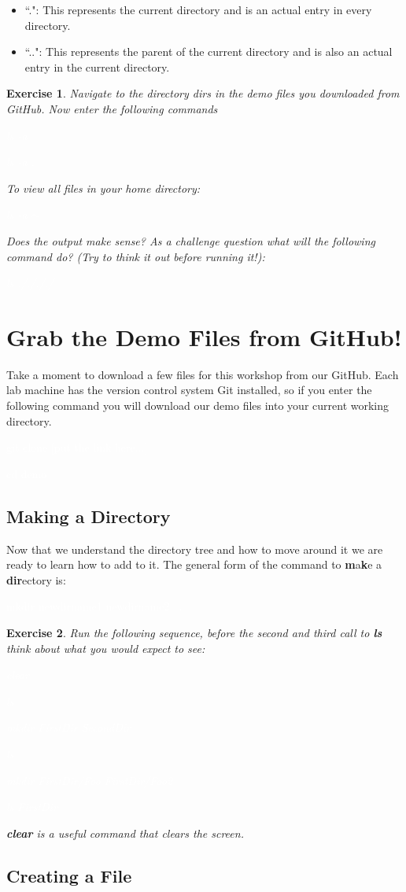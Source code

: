 \documentclass[oneside]{book}
\newcommand{\commandline}[1]{\begin{center} \colorbox{Dark}{\textcolor{white}{#1}} \end{center}}
\newtheorem{ex}{Exercise}[chapter]
\begin{document}
\begin{itemize}
	\item ``.": This represents the current directory and is an actual entry in every directory.
	\item ``..": This represents the parent of the current directory and is also an actual entry in the current directory.
\end{itemize}

\begin{ex}
	Navigate to the directory \textit{dirs} in the demo files you downloaded from GitHub. Now enter the following commands 
	\commandline{ls -a}
	\commandline{ls -a .}
To view all files in your home directory:
	\commandline{ls -a $\sim$}

Does the output make sense? As a challenge question what will the following command do? (Try to think it out before running it!):
	\commandline{ls ././././}
\end{ex}

\section{Grab the Demo Files from GitHub!}
Take a moment to download a few files for this workshop from our GitHub. Each lab machine has the version control system Git installed, so if you enter the following command you will download our demo files into your current working directory.

\commandline{git clone [put the link here...]}
\commandline{cd demo}

\subsection{Making a Directory}
Now that we understand the directory tree and how to move around it we are ready to learn how to add to it. The general form of the command to \textbf{m}a\textbf{k}e a \textbf{dir}ectory is:
\commandline{mkdir newdirname1 newdirname2 ...}
\begin{ex}
	Run the following sequence, before the second and third call to \textbf{ls} think about what you would expect to see:
\commandline{clear}
\commandline{ls}
\commandline{mkdir FirstDir SecondDir}
\commandline{ls}
\commandline{mkdir FirstDir/Foo FirstDir/Foo2}
\commandline{ls FirstDir}
\textbf{clear} is a useful command that clears the screen.
\end{ex}

\subsection{Creating a File}
\end{document}
